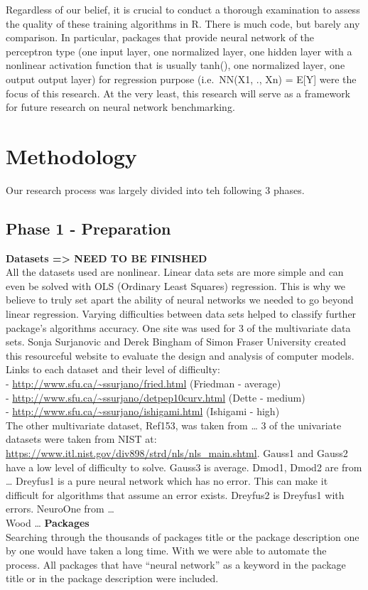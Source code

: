 Regardless of our belief, it is crucial to conduct a thorough
examination to assess the quality of these training algorithms in R.
There is much code, but barely any comparison. In particular, packages
that provide neural network of the perceptron type (one input layer, one
normalized layer, one hidden layer with a nonlinear activation function
that is usually tanh(), one normalized layer, one output output layer)
for regression purpose (i.e.~NN(X1, ., Xn) = E{[}Y{]} were the focus of
this research. At the very least, this research will serve as a
framework for future research on neural network benchmarking.

\hypertarget{methodology}{%
\section{Methodology}\label{methodology}}

Our research process was largely divided into teh following 3 phases.

\hypertarget{phase-1---preparation}{%
\subsection{Phase 1 - Preparation}\label{phase-1---preparation}}

\textbf{Datasets =\textgreater{} NEED TO BE FINISHED}\\
All the datasets used are nonlinear. Linear data sets are more simple
and can even be solved with OLS (Ordinary Least Squares) regression.
This is why we believe to truly set apart the ability of neural networks
we needed to go beyond linear regression. Varying difficulties between
data sets helped to classify further package's algorithms accuracy. One
site was used for 3 of the multivariate data sets. Sonja Surjanovic and
Derek Bingham of Simon Fraser University created this resourceful
website to evaluate the design and analysis of computer models. Links to
each dataset and their level of difficulty:\\
- \url{http://www.sfu.ca/~ssurjano/fried.html} (Friedman - average)\\
- \url{http://www.sfu.ca/~ssurjano/detpep10curv.html} (Dette - medium)\\
- \url{http://www.sfu.ca/~ssurjano/ishigami.html} (Ishigami - high)\\
The other multivariate dataset, Ref153, was taken from \ldots{} 3 of the
univariate datasets were taken from NIST at:
\url{https://www.itl.nist.gov/div898/strd/nls/nls_main.shtml}. Gauss1
and Gauss2 have a low level of difficulty to solve. Gauss3 is average.
Dmod1, Dmod2 are from \ldots{} Dreyfus1 is a pure neural network which
has no error. This can make it difficult for algorithms that assume an
error exists. Dreyfus2 is Dreyfus1 with errors. NeuroOne from \ldots{}\\
Wood \ldots{} \textbf{Packages}\\
Searching through the thousands of packages title or the package
description one by one would have taken a long time. With
 \citep{R-RWsearch} we were able to automate the
process. All packages that have ``neural network'' as a keyword in the
package title or in the package description were included.

